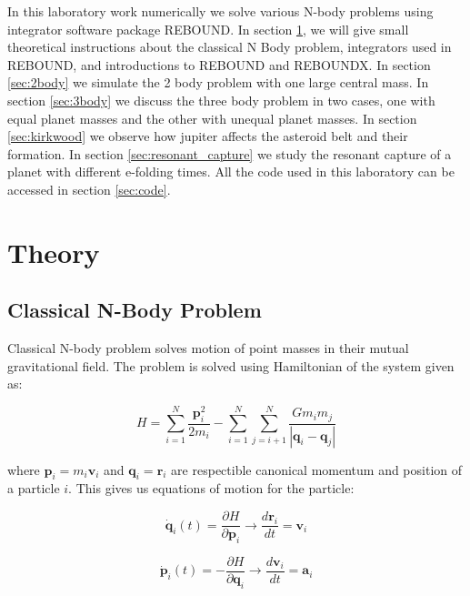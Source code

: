 \documentclass[12pt,a4paper]{article}
\begin{document}
In this laboratory work numerically we solve various N-body problems using integrator software package REBOUND. In section \ref{sec:theory}, we will give small theoretical instructions about the
classical N Body problem, integrators used in REBOUND, and introductions to REBOUND and REBOUNDX. In section \ref{sec:2body} we simulate the 2 body problem with one large central mass. In section \ref{sec:3body}
we discuss the three body problem in two cases, one with equal planet masses and the other with unequal planet masses. In section \ref{sec:kirkwood} we observe how jupiter affects the asteroid belt and their formation.
In section \ref{sec:resonant_capture} we study the resonant capture of a planet with different e-folding times. All the code used in this laboratory can be accessed in section \ref{sec:code}.




\section{Theory}
\label{sec:theory}
\subsection{Classical N-Body Problem}

Classical N-body problem solves motion of point masses in their mutual gravitational field. The problem is solved using Hamiltonian of the system given as:

\begin{equation}
	H = \sum_{i=1}^{N} \frac{\textbf{p}_i^2}{2 m_i} - \sum_{i=1}^{N} \sum_{j=i+1}^{N} \frac{G m_i m_j}{|\textbf{q}_i - \textbf{q}_j|}
\end{equation}

where $\textbf{p}_i = m_i \textbf{v}_i$ and $\textbf{q}_i = \textbf{r}_i$ are respectible canonical momentum and position of a particle $i$. This gives us equations of motion for the particle:

\begin{equation}
	\dot{\textbf{q}}_i(t) = \frac{\partial H}{\partial \textbf{p}_i} \xrightarrow{} \frac{d \textbf{r}_i}{dt} = \textbf{v}_i
\end{equation}

\begin{equation}
	\dot{\textbf{p}}_i(t) = -\frac{\partial H}{\partial \textbf{q}_i} \xrightarrow{} \frac{d \textbf{v}_i}{dt} = \textbf{a}_i
\end{equation}
\end{document}
